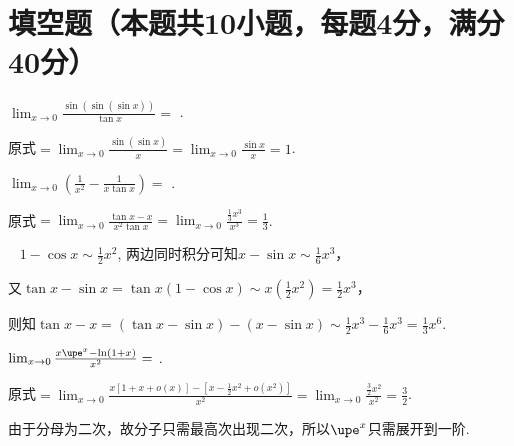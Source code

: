 \documentclass{USTBExam}
\author{北京科技大学学生学习与发展指导中心·朋辈讲师团·高数组·黄腾}
\begin{document}
\maketitle

\section{填空题（本题共10小题，每题4分，满分40分）}

\begin{problem}
  $\lim _{x \to 0} \frac{\sin (\sin (\sin x))}{\tan x}=$
  \fillin[1].
\end{problem}

\begin{analysis}
  原式$=\lim_{x \to 0} \frac{\sin\left( \sin x \right)}{x} = \lim_{x \to 0} \frac{\sin x}{x} = 1$.
\end{analysis}

\begin{problem}
  $\lim _{x \to 0}\left(\frac{1}{x^{2}}-\frac{1}{x \tan x}\right)=$
  \fillin[$\frac{1}{3}$].
\end{problem}

\begin{analysis}
  原式$=\lim_{x \to 0} \frac{\tan x - x}{x^2 \tan x} = \lim_{x \to 0} \frac{\frac{1}{3}x^3}{x^3} = \frac{1}{3}$.

  \faMortarBoard~ $1 - \cos x \sim \frac{1}{2}x^2$, 两边同时积分可知$x - \sin x \sim \frac{1}{6}x^3$，

  又$\tan x - \sin x = \tan x \left( 1 - \cos x \right) \sim x \left( \frac{1}{2}x^2 \right) = \frac{1}{2}x^3$，

  则知$\tan x - x = \left( \tan x - \sin x \right) - \left( x - \sin x \right) \sim \frac{1}{2}x^3 - \frac{1}{6} x^3 = \frac{1}{3}x^6$.
\end{analysis}

\begin{problem}
  $\lim _{x \to 0} \frac{x \upe^{x}-\ln (1+x)}{x^{2}}=$
  \fillin[$\frac{3}{2}$].
\end{problem}

\begin{analysis}
  原式$=\lim_{x \to 0} \frac{x \left[ 1+x+o(x) \right] - \left[ x - \frac{1}{2}x^2 +o(x^2) \right]}{x^2} = \lim_{x \to 0} \frac{\frac{3}{2}x^2}{x^2} = \frac{3}{2}$.

  \faMortarBoard 由于分母为二次，故分子只需最高次出现二次，所以$\upe^x$只需展开到一阶.
\end{analysis}
\end{document}
